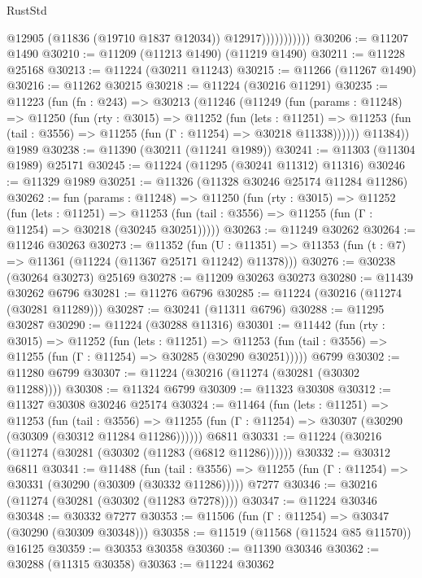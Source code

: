 \begin{lexlean}{RustStd}
\begin{coremodule}
                          @12905
                          (@11836 (@19710 @1837 @12034))
                          @12917)))))))))))
@30206 := @11207 @1490
@30210 := @11209 (@11213 @1490) (@11219 @1490)
@30211 := @11228 @25168
@30213 := @11224 (@30211 @11243)
@30215 := @11266 (@11267 @1490)
@30216 := @11262 @30215
@30218 := @11224 (@30216 @11291)
@30235 := @11223
    (fun (fn : @243) =>
    @30213
      (@11246
        (@11249
          (fun (params : @11248) =>
          @11250
            (fun (rty : @3015) =>
            @11252
              (fun (lets : @11251) =>
              @11253 (fun (tail : @3556) => @11255 (fun (Γ : @11254) => @30218 @11338))))))
        @11384))
    @1989
@30238 := @11390 (@30211 (@11241 @1989))
@30241 := @11303 (@11304 @1989) @25171
@30245 := @11224 (@11295 (@30241 @11312) @11316)
@30246 := @11329 @1989
@30251 := @11326 (@11328 @30246 @25174 @11284 @11286)
@30262 := fun (params : @11248) =>
  @11250
    (fun (rty : @3015) =>
    @11252
      (fun (lets : @11251) =>
      @11253 (fun (tail : @3556) => @11255 (fun (Γ : @11254) => @30218 (@30245 @30251)))))
@30263 := @11249 @30262
@30264 := @11246 @30263
@30273 := @11352
    (fun (U : @11351) => @11353 (fun (t : @7) => @11361 (@11224 (@11367 @25171 @11242) @11378)))
@30276 := @30238 (@30264 @30273) @25169
@30278 := @11209 @30263 @30273
@30280 := @11439 @30262 @6796
@30281 := @11276 @6796
@30285 := @11224 (@30216 (@11274 (@30281 @11289)))
@30287 := @30241 (@11311 @6796)
@30288 := @11295 @30287
@30290 := @11224 (@30288 @11316)
@30301 := @11442
    (fun (rty : @3015) =>
    @11252
      (fun (lets : @11251) =>
      @11253 (fun (tail : @3556) => @11255 (fun (Γ : @11254) => @30285 (@30290 @30251)))))
    @6799
@30302 := @11280 @6799
@30307 := @11224 (@30216 (@11274 (@30281 (@30302 @11288))))
@30308 := @11324 @6799
@30309 := @11323 @30308
@30312 := @11327 @30308 @30246 @25174
@30324 := @11464
    (fun (lets : @11251) =>
    @11253
      (fun (tail : @3556) =>
      @11255 (fun (Γ : @11254) => @30307 (@30290 (@30309 (@30312 @11284 @11286))))))
    @6811
@30331 := @11224 (@30216 (@11274 (@30281 (@30302 (@11283 (@6812 @11286))))))
@30332 := @30312 @6811
@30341 := @11488
    (fun (tail : @3556) => @11255 (fun (Γ : @11254) => @30331 (@30290 (@30309 (@30332 @11286)))))
    @7277
@30346 := @30216 (@11274 (@30281 (@30302 (@11283 @7278))))
@30347 := @11224 @30346
@30348 := @30332 @7277
@30353 := @11506 (fun (Γ : @11254) => @30347 (@30290 (@30309 @30348)))
@30358 := @11519 (@11568 (@11524 @85 @11570)) @16125
@30359 := @30353 @30358
@30360 := @11390 @30346
@30362 := @30288 (@11315 @30358)
@30363 := @11224 @30362

\end{coremodule}
\end{lexlean}
